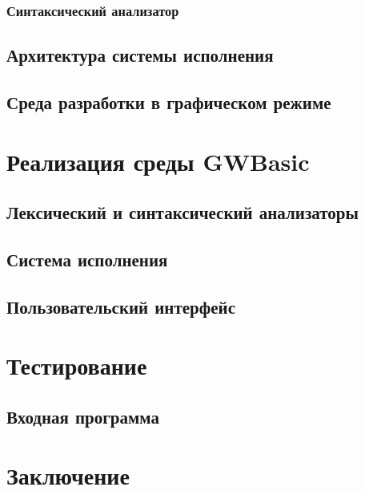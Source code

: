 \documentclass[12pt]{article}
\begin{document}
			\subsubsection{Синтаксический анализатор}
		\subsection{Архитектура системы исполнения}
		\subsection{Среда разработки в графическом режиме}
	\newpage
	\section{Реализация среды GWBasic}
		\subsection{Лексический и синтаксический анализаторы}
		\subsection{Система исполнения}
		\subsection{Пользовательский интерфейс}
	\section{Тестирование}
		\subsection{Входная программа}
	\newpage	
	\section{Заключение}
	\newpage
	\nocite{*}
			
	
	
	\newpage
	\tableofcontents %
\end{document}

